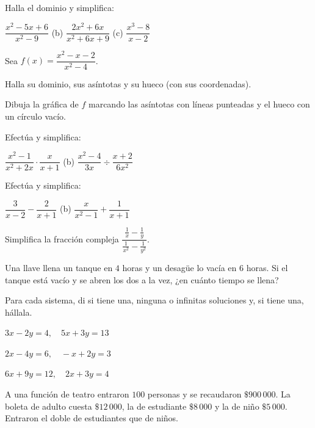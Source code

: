 \documentclass[11pt,a4paper]{article}
\begin{document}
\taller
\begin{ejercicios}
\item Halla el dominio y simplifica:
  \begin{ejercicios}
  \item $\dfrac{x^2-5x+6}{x^2-9}$ \qquad (b) $\dfrac{2x^2+6x}{x^2+6x+9}$ \qquad (c) $\dfrac{x^3-8}{x-2}$
  \end{ejercicios}
\item Sea $f(x)=\dfrac{x^2-x-2}{x^2-4}$.
  \begin{ejercicios}
  \item Halla su dominio, sus asíntotas y su hueco (con sus coordenadas).
  \item Dibuja la gráfica de $f$ marcando las asíntotas con líneas punteadas y el hueco con un círculo vacío.
  \end{ejercicios}
\item Efectúa y simplifica:
  \begin{ejercicios}
  \item $\dfrac{x^2-1}{x^2+2x}\cdot\dfrac{x}{x+1}$ \qquad (b) $\dfrac{x^2-4}{3x}\div\dfrac{x+2}{6x^2}$
  \end{ejercicios}
\item Efectúa y simplifica:
  \begin{ejercicios}
  \item $\dfrac{3}{x-2}-\dfrac{2}{x+1}$ \qquad (b) $\dfrac{x}{x^2-1}+\dfrac{1}{x+1}$
  \end{ejercicios}
\item Simplifica la fracción compleja $\dfrac{\frac1x-\frac1y}{\frac1{x^2}-\frac1{y^2}}$.
\item Una llave llena un tanque en $4$ horas y un desagüe lo vacía en $6$ horas. Si el tanque está vacío y se abren
  los dos a la vez, ¿en cuánto tiempo se llena?
\item Para cada sistema, di si tiene una, ninguna o infinitas soluciones y, si tiene una, hállala.
  \begin{ejercicios}
  \item $3x-2y=4,\quad 5x+3y=13$
  \item $2x-4y=6,\quad -x+2y=3$
  \item $6x+9y=12,\quad 2x+3y=4$
  \end{ejercicios}
\item A una función de teatro entraron $100$ personas y se recaudaron $\$900\,000$. La boleta de adulto cuesta
  $\$12\,000$, la de estudiante $\$8\,000$ y la de niño $\$5\,000$. Entraron el doble de estudiantes que de niños.

\end{ejercicios}
\end{document}

